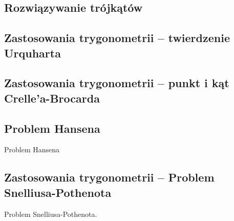 \subsection{Rozwiązywanie trójkątów}


\subsection{Zastosowania trygonometrii -- twierdzenie Urquharta}


\subsection{Zastosowania trygonometrii -- punkt i kąt Crelle'a-Brocarda}


\subsection{Problem Hansena}
Problem Hansena
%

\subsection{Zastosowania trygonometrii -- Problem Snelliusa-Pothenota}
Problem Snelliusa-Pothenota.
%



